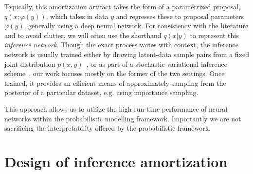 \documentclass[12pt]{article}
\begin{document}


Typically, this amortization
artifact takes the form of a parametrized proposal, $q(x ; \varphi(y))$, which takes
in data $y$ and regresses these to proposal parameters $\varphi(y)$, generally using
a deep neural network.
For consistency with the literature and to avoid clutter, we will often
use the shorthand $q(x|y)$ to represent this \emph{inference network}.
Though the exact process varies with context,
the inference network is usually trained either by drawing latent-data
sample pairs from a fixed joint distribution
$p(x,y)$~\citep{ritchie2016deep,PaigeWood2016,LeEtAl2016}, or 
as part of a stochastic variational inference scheme~\citep{HoffmanEtAl2013,VAE,RezendeEtAl2014},
our work focuses mostly on the former of the two settings.
Once trained, it provides an efficient means of approximately
sampling from the posterior of a particular dataset, e.g. using importance sampling.

This approach allows us to utilize the high run-time performance of neural networks within the probabilistic modelling framework. 
Importantly we are not sacrificing the interpretability offered by the probabilistic framework.



\section{Design of inference amortization}


\end{document}
